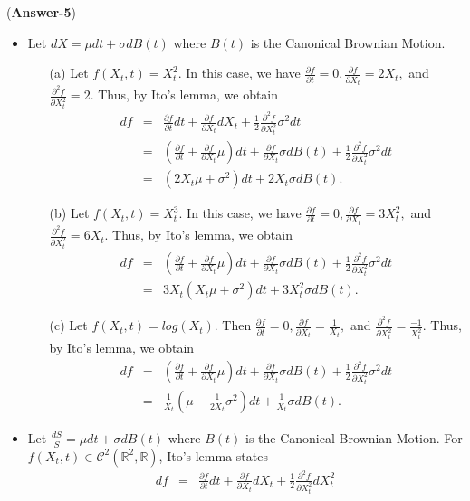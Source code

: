 \documentclass[11pt,twoside,reqno]{article}
\newcommand{\s}{\sigma}
\newcommand{\p}{\partial}
\begin{document}
({\bf Answer-5})
\begin{itemize}
\item Let $dX = \mu dt + \s dB(t)$ where $B(t)$ is the Canonical Brownian Motion. 
\begin{enumerate}
\item[(a)] Let $f(X_t, t) = X_t^2.$ In this case, we have $\frac{\p f}{\p t} = 0, \frac{\p f}{\p X_t} = 2X_t,$ and $ \frac{\p^2 f}{\p X_t^2} = 2$. Thus, by Ito's lemma, we obtain 
\begin{eqnarray*}
df &=&  \frac{\p f}{\p t} dt + \frac{\p f}{\p X_t} dX_t + \frac{1}{2} \frac{\p^2 f}{\p X_t^2}\s^2 dt \\
&=& \left( \frac{\p f}{\p t} + \frac{\p f}{\p X_t}\mu  \right)dt + \frac{\p f}{\p X_t} \s dB(t) + \frac{1}{2} \frac{\p^2 f}{\p X_t^2}  \s^2 dt \\
&=& (2X_t\mu + \s^2)dt + 2X_t\s dB(t).
\end{eqnarray*}
\item[(b)] Let $f(X_t, t) = X_t^3.$ In this case, we have $\frac{\p f}{\p t} = 0, \frac{\p f}{\p X_t} = 3X_t^2,$ and $ \frac{\p^2 f}{\p X_t^2} = 6X_t$. Thus, by Ito's lemma, we obtain 
\begin{eqnarray*}
df &=& \left( \frac{\p f}{\p t} + \frac{\p f}{\p X_t}\mu  \right)dt + \frac{\p f}{\p X_t} \s dB(t) + \frac{1}{2} \frac{\p^2 f}{\p X_t^2}  \s^2 dt \\
&=& 3X_t(X_t\mu + \s^2)dt + 3X_t^2\s dB(t).
\end{eqnarray*}
\item[(c)] Let $f(X_t, t) = log(X_t)$. Then $\frac{\p f}{\p t} = 0, \frac{\p f}{\p X_t} = \frac{1}{X_t},$ and $ \frac{\p^2 f}{\p X_t^2} = \frac{-1}{X_t^2}$. Thus, by Ito's lemma, we obtain 
\begin{eqnarray*}
df &=& \left( \frac{\p f}{\p t} + \frac{\p f}{\p X_t}\mu  \right)dt + \frac{\p f}{\p X_t} \s dB(t) + \frac{1}{2} \frac{\p^2 f}{\p X_t^2}  \s^2 dt \\
&=& \frac{1}{X_t}\left(\mu - \frac{1}{2X_t} \s^2\right)dt + \frac{1}{X_t}\s dB(t).
\end{eqnarray*}
\end{enumerate}
\item Let $\frac{dS}{S} = \mu dt + \s dB(t)$ where $B(t)$ is the Canonical Brownian Motion. 
For $f(X_t, t) \in \mathcal{C}^2(\mathbb{R}^2, \mathbb{R})$, Ito's lemma states
\begin{eqnarray*}
df &=& \frac{\p f}{\p t} dt + \frac{\p f}{\p X_t} dX_t + \frac{1}{2} \frac{\p^2 f}{\p X_t^2} dX_t^2 \\

\end{eqnarray*}
\end{itemize}
\end{document}
